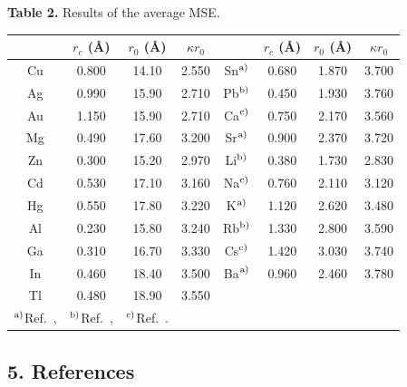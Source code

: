 \documentclass{cpbtex}
\begin{document}
\begin{CJK*}{GBK}{song}
\begin{center}
{\footnotesize{\bf Table 2.} Results of the average MSE.\\
\vspace{2mm}
\begin{tabular}{cccccccc}
\hline
&$r_c$ (\AA) &$r_0$ (\AA) &$\kappa r_0$&
&$r_c$ (\AA) &$r_0$ (\AA) &$\kappa r_0$\\
\hline
Cu& 0.800 & 14.10 & 2.550 &Sn$^{\rm a)}$
& 0.680 & 1.870 & 3.700 \\
Ag& 0.990 & 15.90 & 2.710 &Pb$^{\rm b)}$
& 0.450 & 1.930 & 3.760 \\
Au& 1.150 & 15.90 & 2.710 &Ca$^{\rm c)}$
& 0.750 & 2.170 & 3.560 \\
Mg& 0.490 & 17.60 & 3.200 &Sr$^{\rm a)}$
& 0.900 & 2.370 & 3.720 \\
Zn& 0.300 & 15.20 & 2.970 &Li$^{\rm b)}$
& 0.380 & 1.730 & 2.830 \\
Cd& 0.530 & 17.10 & 3.160 &Na$^{\rm c)}$
& 0.760 & 2.110 & 3.120 \\
Hg& 0.550 & 17.80 & 3.220 &K$^{\rm a)}$
&  1.120 & 2.620 & 3.480 \\
Al& 0.230 & 15.80 & 3.240 &Rb$^{\rm b)}$
& 1.330 & 2.800 & 3.590 \\
Ga& 0.310 & 16.70 & 3.330 &Cs$^{\rm c)}$
& 1.420 & 3.030 & 3.740 \\
In& 0.460 & 18.40 & 3.500 &Ba$^{\rm a)}$
& 0.960 & 2.460 & 3.780 \\
Tl& 0.480 & 18.90 & 3.550 & & & & \\
\hline
$^{\rm a)}${Ref.~\cite{2}}, &
$^{\rm b)}${Ref.~\cite{3}}, &
$^{\rm c)}${Ref.~\cite{4}}.
\end{tabular}}
\end{center}


\subsection*{5. References}


\end{CJK*}  %
\end{document}
